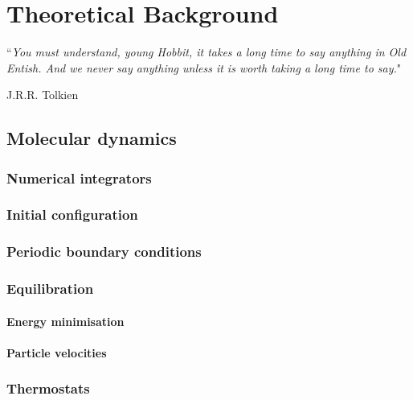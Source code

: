 \chapter{Theoretical Background}
\label{Introduction}

\epigraph{``\textit{You must understand, young Hobbit, it takes a long time to say anything in Old Entish. And we never say anything unless it is worth taking a long time to say.}"}{J.R.R. Tolkien}

\section{Molecular dynamics}\label{chapter:MD}

\subsection{Numerical integrators} \label{sec:integrators}
%
%

\subsection{Initial configuration} 

\subsection{Periodic boundary conditions}

\subsection{Equilibration} \label{sec:equilibration}

\subsubsection{Energy minimisation}

\subsubsection{Particle velocities}

\subsection{Thermostats}
%

